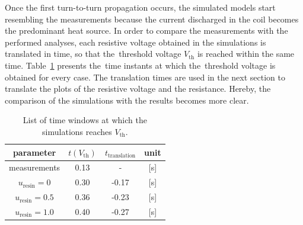 Once the first turn-to-turn propagation occurs, the simulated models start resembling the measurements because the current discharged in the coil becomes the predominant heat source. In order to compare the measurements with the performed analyses, each resistive voltage obtained in the simulations is translated in time, so that the~threshold voltage $V_\text{th}$ is reached within the same time. Table~\ref{table: skew_quad_v_res_q_det} presents the~time instants at which the~threshold voltage is obtained for every case. The translation times are used in the next section to translate the plots of the resistive voltage and the resistance. Hereby, the comparison of the simulations with the results becomes more clear. 

\begin{table}[H]
    \caption{List of time windows at which the simulations reaches $V_\text{th}$.} 
    \vspace{-1.em} 
    \fontsize{10}{10}
    \selectfont 
    \renewcommand{\arraystretch}{1.5}
    \begin{center}
        \begin{tabular}{ cccc }  
        \hline
        parameter & $t(V_\text{th})$ & $t_\text{translation}$ & unit \\
        \hline
        measurements & 0.13 & - & [s] \\
        $u_\text{resin}=0$ & 0.30 & -0.17 & [s] \\
        $u_\text{resin}=0.5$ & 0.36 & -0.23 & [s] \\
        $u_\text{resin}=1.0$ & 0.40 & -0.27 & [s] \\
        \hline 
        \end{tabular}
    \end{center}  
     \label{table: skew_quad_v_res_q_det} 
 \end{table}